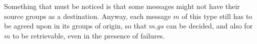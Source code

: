 \documentclass[times, 10pt]{article}
\begin{document}
Something that must be noticed is that some messages might not have their source groups as a destination. Anyway, each message $m$ of this type still has to be agreed upon in its groups of origin, so that $m.gs$ can be decided, and also for $m$ to be retrievable, even in the presence of failures.%
\end{document}
